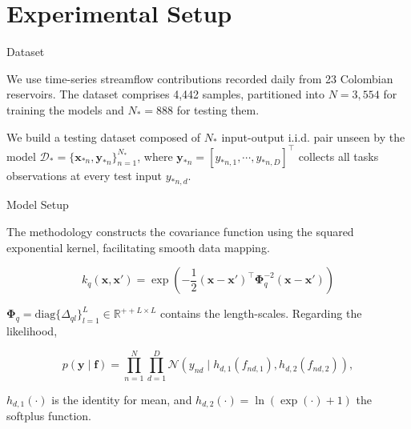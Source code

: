 \section{Experimental Setup}

\begin{frame}{Dataset}

\begin{block}{}
	We use time-series streamflow contributions recorded daily from 23 Colombian reservoirs. The dataset comprises 4,442 samples, partitioned into \(N=3,554\) for training the models and \(N_*=888\) for testing them.
\end{block}
	\vspace{1em}
\begin{block}{}
	We build a testing dataset composed of \( N_* \) input-output i.i.d. pair unseen by the model \( \mathcal{D}_* = \{\boldsymbol{x}_{*n}, \boldsymbol{y}_{*n}\}_{n=1}^{N_*} \), where \( \boldsymbol{y}_{*n} = [y_{*n,1}, \cdots, y_{*n, D}]^\top \) collects all tasks observations at every test input \( y_{*n,d}\).
\end{block}
	
\end{frame}

\begin{frame}{Model Setup}

\begin{block}{}
	The methodology constructs the covariance function using the squared exponential kernel, facilitating smooth data mapping.
\end{block}


\[
	k_{q}\left(\boldsymbol{x}, \boldsymbol{x}' \right) = \exp\left(-\frac{1}{2}(\boldsymbol{x} - \boldsymbol{x}')^\top \boldsymbol{\Phi}_q^{-2} (\boldsymbol{x} - \boldsymbol{x}')\right)
\]

\begin{block}{}
\( \boldsymbol{\Phi}_q=\text{diag}\{\Delta_{ql}\}_{l=1}^{L} \in \mathbb{R}^{++L \times L} \) contains the length-scales. Regarding the likelihood,
\end{block}

\[
	p(\boldsymbol{y} \mid \boldsymbol{f}) = \prod_{n=1}^{N}\prod_{d=1}^{D} \mathcal{N}\left(y_{nd} \mid h_{d,1}(f_{nd,1}), h_{d,2}(f_{nd,2}) \right),
\]

\begin{block}{}
$h_{d,1}(\cdot)$ is the identity for mean, and $h_{d,2}(\cdot) = \ln(\exp(\cdot)+1)$ the softplus function.
\end{block}

\end{frame}



